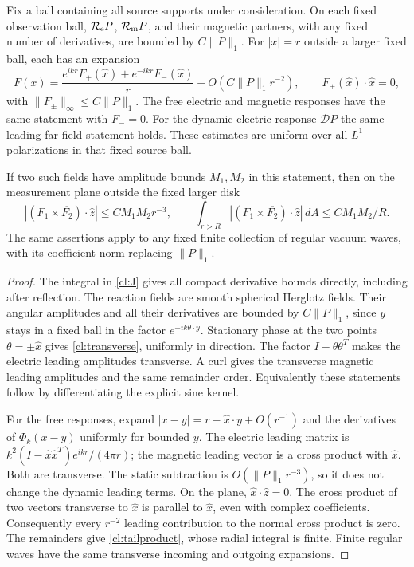 \begin{lemma}
\label{cl:kernelbounds}
Fix a ball containing all source supports under consideration.
On each fixed observation ball, $\mathcal R_{\rm e}P$,
$\mathcal R_{\rm m}P$, and their magnetic partners, with any fixed
number of derivatives, are bounded by $C\|P\|_1$.
For $|x|=r$ outside a larger fixed ball, each has an expansion
\begin{equation}\label{cl:transverse}
 F(x)=\frac{e^{ikr}F_+(\widehat x)+e^{-ikr}F_-(\widehat x)}r
                +O(C\|P\|_1r^{-2}),\qquad
 F_\pm(\widehat x)\cdot\widehat x=0,
\end{equation}
with $\|F_\pm\|_\infty\leq C\|P\|_1$. The free electric and
magnetic responses have the same statement with $F_-=0$.
For the dynamic electric response $\mathcal D P$ the same leading
far-field statement holds. These estimates are uniform over all
$L^1$ polarizations in that fixed source ball.

If two such fields have amplitude bounds $M_1,M_2$ in this
statement, then on the measurement plane outside the fixed larger
disk
\begin{equation}\label{cl:tailproduct}
 |(F_1\times\overline{F_2})\cdot\widehat z|
        \leq C M_1M_2r^{-3},\qquad
 \int_{r>R}|(F_1\times\overline{F_2})\cdot\widehat z|\,dA
        \leq C M_1M_2/R.
\end{equation}
The same assertions apply to any fixed finite collection of regular
vacuum waves, with its coefficient norm replacing $\|P\|_1$.
\end{lemma}
\begin{proof}
The integral in \eqref{cl:J} gives all compact derivative bounds
directly, including after reflection. The reaction fields are
smooth spherical Herglotz fields. Their angular amplitudes and all
their derivatives are bounded by $C\|P\|_1$, since $y$ stays in
a fixed ball in the factor $e^{-ik\theta\cdot y}$.
Stationary phase at the two points $\theta=\pm\widehat x$ gives
\eqref{cl:transverse}, uniformly in direction. The factor
$I-\theta\theta^T$ makes the electric leading amplitudes
transverse. A curl gives the transverse magnetic leading
amplitudes and the same remainder order. Equivalently these
statements follow by differentiating the explicit sine kernel.

For the free responses, expand $|x-y|=r-\widehat x\cdot y+O(r^{-1})$
and the derivatives of $\Phi_k(x-y)$ uniformly for bounded $y$.
The electric leading matrix is
$k^2(I-\widehat x\widehat x^T)e^{ikr}/(4\pi r)$;
the magnetic leading vector is a cross product with $\widehat x$.
Both are transverse. The static subtraction is $O(\|P\|_1r^{-3})$,
so it does not change the dynamic leading terms.
On the plane, $\widehat x\cdot\widehat z=0$. The cross product
of two vectors transverse to $\widehat x$ is parallel to
$\widehat x$, even with complex coefficients. Consequently every
$r^{-2}$ leading contribution to the normal cross product is zero.
The remainders give \eqref{cl:tailproduct}, whose radial integral
is finite. Finite regular waves have the same transverse incoming
and outgoing expansions.
\end{proof}

